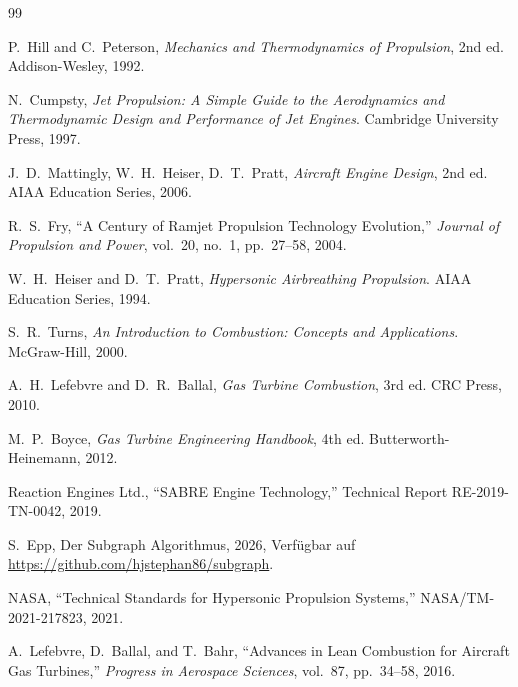 ﻿\documentclass[12pt,a4paper]{article}
\theoremstyle{remark}
\begin{document}
\begin{thebibliography}{99}

P.~Hill and C.~Peterson,
\textit{Mechanics and Thermodynamics of Propulsion}, 2nd ed.
Addison-Wesley, 1992.

N.~Cumpsty,
\textit{Jet Propulsion: A Simple Guide to the Aerodynamics and Thermodynamic Design and Performance of Jet Engines}.
Cambridge University Press, 1997.

J.~D.~Mattingly, W.~H.~Heiser, D.~T.~Pratt,
\textit{Aircraft Engine Design}, 2nd ed.
AIAA Education Series, 2006.

R.~S.~Fry,
``A Century of Ramjet Propulsion Technology Evolution,''
\textit{Journal of Propulsion and Power}, vol.~20, no.~1, pp.~27--58, 2004.

W.~H.~Heiser and D.~T.~Pratt,
\textit{Hypersonic Airbreathing Propulsion}.
AIAA Education Series, 1994.

S.~R.~Turns,
\textit{An Introduction to Combustion: Concepts and Applications}.
McGraw-Hill, 2000.

A.~H.~Lefebvre and D.~R.~Ballal,
\textit{Gas Turbine Combustion}, 3rd ed.
CRC Press, 2010.

M.~P.~Boyce,
\textit{Gas Turbine Engineering Handbook}, 4th ed.
Butterworth-Heinemann, 2012.

Reaction Engines Ltd.,
``SABRE Engine Technology,''
Technical Report RE-2019-TN-0042, 2019.

S.~Epp, Der Subgraph Algorithmus, 2026, Verfügbar auf \url{https://github.com/hjstephan86/subgraph}.

NASA,
``Technical Standards for Hypersonic Propulsion Systems,''
NASA/TM-2021-217823, 2021.

A.~Lefebvre, D.~Ballal, and T.~Bahr,
``Advances in Lean Combustion for Aircraft Gas Turbines,''
\textit{Progress in Aerospace Sciences}, vol.~87, pp.~34--58, 2016.

\end{thebibliography}
\end{document}

